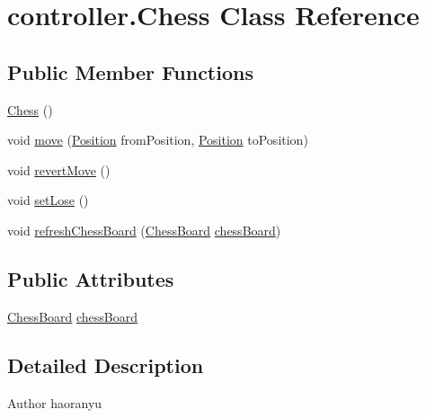 \hypertarget{classcontroller_1_1_chess}{\section{controller.\+Chess Class Reference}
\label{classcontroller_1_1_chess}
}
\subsection*{Public Member Functions}
\begin{DoxyCompactItemize}
\item 
\hyperlink{classcontroller_1_1_chess_a2c1309e8692f00316241d98e2f6b7e5e}{Chess} ()
\item 
void \hyperlink{classcontroller_1_1_chess_afc19fcbd3f986a303420c3f0a839939b}{move} (\hyperlink{classmodel_core_1_1_position}{Position} from\+Position, \hyperlink{classmodel_core_1_1_position}{Position} to\+Position)
\item 
void \hyperlink{classcontroller_1_1_chess_afc0facf7bde50143b81e1ad32adaf15f}{revert\+Move} ()
\item 
void \hyperlink{classcontroller_1_1_chess_a73d82959d3d274bf9288755e27dba9f0}{set\+Lose} ()
\item 
void \hyperlink{classcontroller_1_1_chess_a28506a76694846950209b6b5bdd703f6}{refresh\+Chess\+Board} (\hyperlink{classmodel_core_1_1_chess_board}{Chess\+Board} \hyperlink{classcontroller_1_1_chess_a164cd5f5f19d10c48516afd818e410f9}{chess\+Board})
\end{DoxyCompactItemize}
\subsection*{Public Attributes}
\begin{DoxyCompactItemize}
\item 
\hyperlink{classmodel_core_1_1_chess_board}{Chess\+Board} \hyperlink{classcontroller_1_1_chess_a164cd5f5f19d10c48516afd818e410f9}{chess\+Board}
\end{DoxyCompactItemize}


\subsection{Detailed Description}
\begin{DoxyAuthor}{Author}
haoranyu 
\end{DoxyAuthor}


